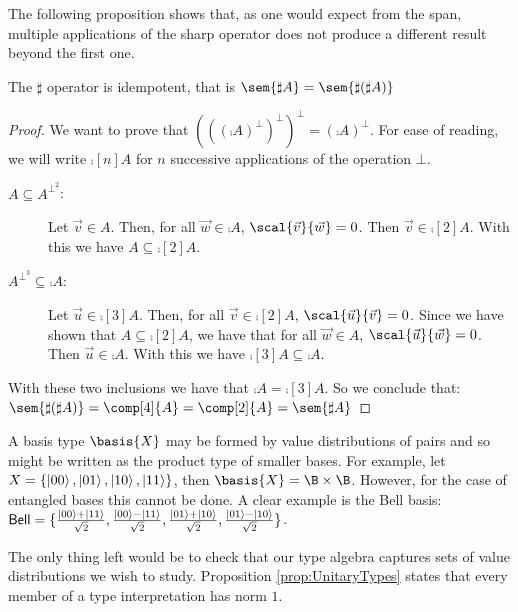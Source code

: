 The following proposition shows that, as one would expect from the span, multiple applications of the sharp operator does not produce a different result beyond the first one.   

\begin{proposition}\label{prop:IdempotentSharp}
  The $\sharp$ operator is idempotent, that is $\sem{\sharp A} = \sem{\sharp (\sharp A)}$
\end{proposition}

\begin{proof}
  We want to prove that $(((\comp{A})^\bot)^\bot)^\bot = (\comp{A})^\bot$. For ease of reading, we will write $\comp[n]{A}$ for $n$ successive applications of the operation $\bot$.

  \begin{description}
    \item[$A\subseteq A^{\bot^2}$:] Let $\vec{v}\in A$. Then, for all $\vec{w}\in\comp{A}$, $\scal{\vec{v}}{\vec{w}} = 0$. Then $\vec{v}\in\comp[2]{A}$. With this we have $A\subseteq\comp[2]{A}$.
    
    \item[$A^{\bot^3}\subseteq \comp{A}$:] Let $\vec{u}\in \comp[3]{A}$. Then, for all $\vec{v}\in\comp[2]{A}$, $\scal{\vec u}{\vec v} = 0$. Since we have shown that $A\subseteq \comp[2]{A}$, we have that for all $\vec{w}\in A$, $\scal{\vec u}{\vec w} = 0$. Then $\vec u\in\comp{A}$. With this we have $\comp[3]{A}\subseteq \comp{A}$.
  \end{description}

  With these two inclusions we have that $\comp{A}=\comp[3]{A}$. So we conclude that: $\sem{\sharp(\sharp A)} = \comp[4]{A} = \comp[2]{A} = \sem{\sharp A}$ \qedhere
\end{proof}

\begin{remark}
  A basis type $\basis{X}$ may be formed by value distributions of pairs and so might be written as the product type of smaller bases. For example, let $X=\{\ket{00}, \ket{01}, \ket{10}, \ket{11}\}$, then $\basis{X}=\B\times\B$. However, for the case of entangled bases this cannot be done. A clear example is the Bell basis: $\mathsf{Bell}=\{\frac{\ket{00}+\ket{11}}{\sqrt{2}},\frac{\ket{00}-\ket{11}}{\sqrt{2}},\frac{\ket{01}+\ket{10}}{\sqrt{2}},\frac{\ket{01}-\ket{10}}{\sqrt{2}}\}$.
\end{remark}

The only thing left would be to check that our type algebra captures sets of value distributions we wish to study. Proposition \ref{prop:UnitaryTypes} states that every member of a type interpretation has norm $1$.

